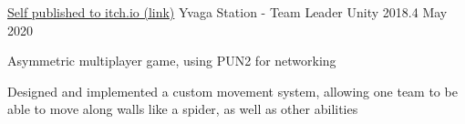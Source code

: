 

\begin{cventries}

    \cventry
    {\href{https://dayluke.itch.io/yvaga-station}{Self published to itch.io (link)}}
    {Yvaga Station - Team Leader}
    {Unity 2018.4}
    {May 2020}
    {
        \begin{cvitems}
            \item Asymmetric multiplayer game, using PUN2 for networking
            \item Designed and implemented a custom movement system, allowing one team to be able to move along walls like a spider, as well as other abilities
        \end{cvitems}
    }
\end{cventries}
